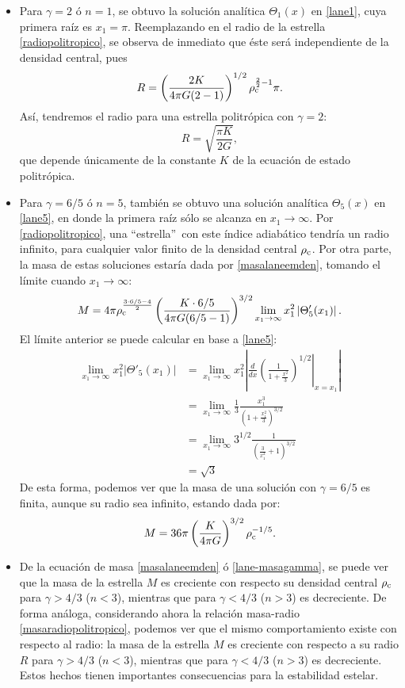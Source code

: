 \begin{itemize}
\item Para $\gamma=2$ ó $n=1$, se obtuvo la solución analítica $\Theta_1(x)$ en \eqref{lane1}, cuya primera raíz es $x_1=\pi$. Reemplazando en el radio de la estrella \eqref{radiopolitropico}, se observa de inmediato que éste será independiente de la densidad central, pues
 \begin{equation}
  R=\left(\frac{2K}{4\pi G(2-1)}\right)^{1/2}\rho_{\rm c}^{\frac{2}{2}-1}\pi.
 \end{equation}
Así, tendremos el radio para una estrella politrópica con $\gamma=2$:
\begin{equation}
 R=\sqrt{\frac{\pi K}{2G}},
\end{equation}
que depende únicamente de la constante $K$ de la ecuación de estado politrópica.

\item  Para $\gamma=6/5$ ó $n=5$, también se obtuvo una solución analítica $\Theta_5(x)$ en \eqref{lane5}, en donde la primera raíz sólo se alcanza en $x_1\to\infty$. Por \eqref{radiopolitropico}, una ``estrella''\, con este índice adiabático tendría un radio infinito, para cualquier valor finito de la densidad central $\rho_{\rm c}$. Por otra parte, la masa de estas soluciones estaría dada por \eqref{masalaneemden}, tomando el límite cuando $x_1\to\infty$:
\begin{align}
 M=4\pi\rho_{\rm c}^{\frac{3\cdot6/5-4}{2}}\left(\frac{K\cdot6/5}{4\pi G(6/5-1)}\right)^{3/2}\lim_{x_1\to\infty}x_1^2\left|\Theta'_5(x_1)\right|.
\end{align}
El límite anterior se puede calcular en base a \eqref{lane5}:
\begin{align}
 \lim_{x_1\to\infty}x_1^2\left|\Theta'_5(x_1)\right|&=\lim_{x_1\to\infty}x_1^2\left|\frac{d}{dx}\left.\left(\frac{1}{1+\frac{x^2}{3}}\right)^{1/2}\right|_{x=x_1}\right|\\
 &=\lim_{x_1\to\infty}\frac{1}{3}\frac{x_1^3}{\left(1+\frac{x_1^2}{3}\right)^{3/2}}\\
 &=\lim_{x_1\to\infty}3^{1/2}\frac{1}{\left(\frac{3}{x_1^2}+1\right)^{3/2}}\\
 &=\sqrt{3}
\end{align}
De esta forma, podemos ver que la masa de una solución con $\gamma=6/5$ es finita, aunque su radio sea infinito, estando dada por:
\begin{equation}
 M=36\pi\left(\frac{K}{4\pi G}\right)^{3/2}\rho_{\rm c}^{-1/5}.
\end{equation}


 \item De la ecuación de masa \eqref{masalaneemden} ó \eqref{lane-masagamma}, se puede ver que la masa de la estrella $M$ es creciente con respecto su densidad central $\rho_{\rm c}$ para $\gamma>4/3$ ($n<3$), mientras que para $\gamma<4/3$ ($n>3$) es decreciente. De forma análoga, considerando ahora la relación masa-radio \eqref{masaradiopolitropico}, podemos ver que el mismo comportamiento existe con respecto al radio: la masa de la estrella $M$ es creciente con respecto a su radio $R$ para $\gamma>4/3$ ($n<3$), mientras que para $\gamma<4/3$ ($n>3$) es decreciente. Estos hechos tienen importantes consecuencias para la estabilidad estelar.


\end{itemize}
